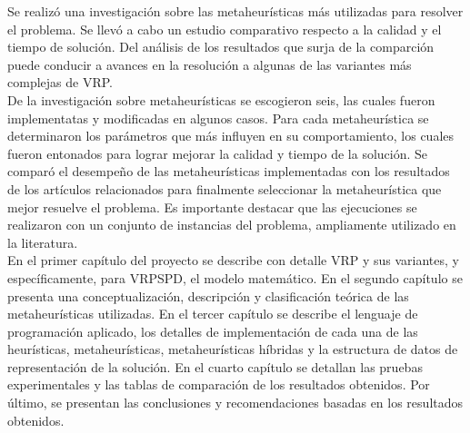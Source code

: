 
Se realizó una investigación sobre las metaheurísticas más utilizadas para resolver el problema. Se llevó a cabo un estudio comparativo respecto a la calidad y el tiempo  de solución. Del análisis de los resultados que surja de la comparción puede conducir a avances en la resolución a algunas de las variantes más complejas de VRP.\\

De la investigación sobre metaheurísticas se escogieron seis, las cuales fueron implementatas y modificadas en algunos casos. Para cada metaheurística se determinaron los parámetros que más influyen en su comportamiento, los cuales  fueron entonados para lograr mejorar la calidad y tiempo de la solución. Se comparó el desempeño de las metaheurísticas implementadas con los resultados de los artículos relacionados para finalmente seleccionar la metaheurística que mejor resuelve el problema. Es importante destacar que las ejecuciones se realizaron con un conjunto de instancias del problema, ampliamente utilizado en la literatura. \\


En el primer capítulo del proyecto se describe con detalle VRP y sus variantes, y específicamente, para VRPSPD, el modelo matemático. En el segundo capítulo se presenta una conceptualización, descripción  y clasificación teórica de las metaheurísticas utilizadas. En el tercer capítulo se describe el lenguaje de programación aplicado, los detalles de implementación de cada una de las heurísticas, metaheurísticas, metaheurísticas híbridas y la estructura de datos de representación de la solución. En el cuarto capítulo se detallan las pruebas experimentales y las tablas de comparación de los resultados obtenidos. Por último, se presentan las conclusiones y recomendaciones basadas en los resultados obtenidos.




